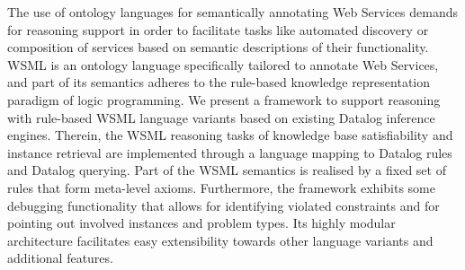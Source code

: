 The use of ontology languages for semantically annotating Web
Services demands for reasoning support in order to facilitate
tasks like automated discovery or composition of services based on
semantic descriptions of their functionality. WSML is an ontology
language specifically tailored to annotate Web Services, and part
of its semantics adheres to the rule-based knowledge
representation paradigm of logic programming. We present a
framework to support reasoning with rule-based WSML language
variants based on existing Datalog inference engines. Therein, the
WSML reasoning tasks of knowledge base satisfiability and instance
retrieval are implemented through a language mapping to Datalog
rules and Datalog querying. Part of the WSML semantics is realised
by a fixed set of rules that form meta-level axioms. Furthermore,
the framework exhibits some debugging functionality that allows
for identifying violated constraints and for pointing out involved
instances and problem types. Its highly modular architecture
facilitates easy extensibility towards other language variants and
additional features.


